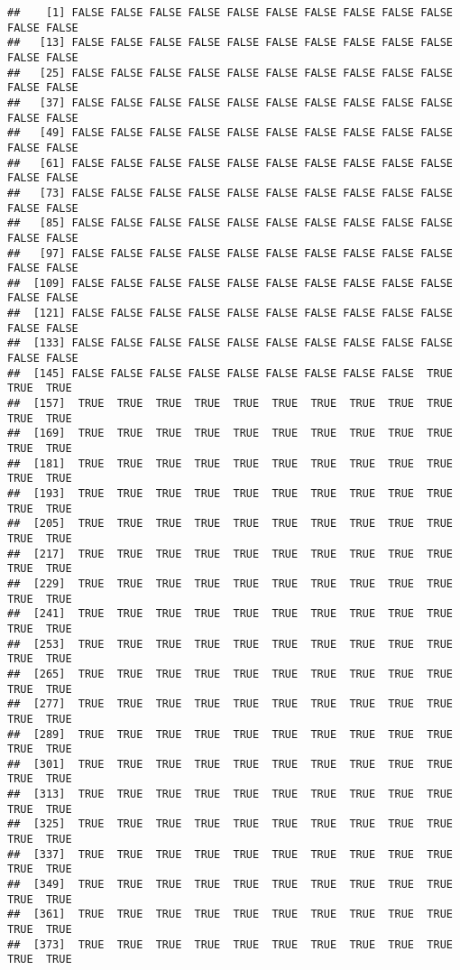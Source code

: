 \documentclass[
]{article}
\begin{document}
\begin{verbatim}
##    [1] FALSE FALSE FALSE FALSE FALSE FALSE FALSE FALSE FALSE FALSE FALSE FALSE
##   [13] FALSE FALSE FALSE FALSE FALSE FALSE FALSE FALSE FALSE FALSE FALSE FALSE
##   [25] FALSE FALSE FALSE FALSE FALSE FALSE FALSE FALSE FALSE FALSE FALSE FALSE
##   [37] FALSE FALSE FALSE FALSE FALSE FALSE FALSE FALSE FALSE FALSE FALSE FALSE
##   [49] FALSE FALSE FALSE FALSE FALSE FALSE FALSE FALSE FALSE FALSE FALSE FALSE
##   [61] FALSE FALSE FALSE FALSE FALSE FALSE FALSE FALSE FALSE FALSE FALSE FALSE
##   [73] FALSE FALSE FALSE FALSE FALSE FALSE FALSE FALSE FALSE FALSE FALSE FALSE
##   [85] FALSE FALSE FALSE FALSE FALSE FALSE FALSE FALSE FALSE FALSE FALSE FALSE
##   [97] FALSE FALSE FALSE FALSE FALSE FALSE FALSE FALSE FALSE FALSE FALSE FALSE
##  [109] FALSE FALSE FALSE FALSE FALSE FALSE FALSE FALSE FALSE FALSE FALSE FALSE
##  [121] FALSE FALSE FALSE FALSE FALSE FALSE FALSE FALSE FALSE FALSE FALSE FALSE
##  [133] FALSE FALSE FALSE FALSE FALSE FALSE FALSE FALSE FALSE FALSE FALSE FALSE
##  [145] FALSE FALSE FALSE FALSE FALSE FALSE FALSE FALSE FALSE  TRUE  TRUE  TRUE
##  [157]  TRUE  TRUE  TRUE  TRUE  TRUE  TRUE  TRUE  TRUE  TRUE  TRUE  TRUE  TRUE
##  [169]  TRUE  TRUE  TRUE  TRUE  TRUE  TRUE  TRUE  TRUE  TRUE  TRUE  TRUE  TRUE
##  [181]  TRUE  TRUE  TRUE  TRUE  TRUE  TRUE  TRUE  TRUE  TRUE  TRUE  TRUE  TRUE
##  [193]  TRUE  TRUE  TRUE  TRUE  TRUE  TRUE  TRUE  TRUE  TRUE  TRUE  TRUE  TRUE
##  [205]  TRUE  TRUE  TRUE  TRUE  TRUE  TRUE  TRUE  TRUE  TRUE  TRUE  TRUE  TRUE
##  [217]  TRUE  TRUE  TRUE  TRUE  TRUE  TRUE  TRUE  TRUE  TRUE  TRUE  TRUE  TRUE
##  [229]  TRUE  TRUE  TRUE  TRUE  TRUE  TRUE  TRUE  TRUE  TRUE  TRUE  TRUE  TRUE
##  [241]  TRUE  TRUE  TRUE  TRUE  TRUE  TRUE  TRUE  TRUE  TRUE  TRUE  TRUE  TRUE
##  [253]  TRUE  TRUE  TRUE  TRUE  TRUE  TRUE  TRUE  TRUE  TRUE  TRUE  TRUE  TRUE
##  [265]  TRUE  TRUE  TRUE  TRUE  TRUE  TRUE  TRUE  TRUE  TRUE  TRUE  TRUE  TRUE
##  [277]  TRUE  TRUE  TRUE  TRUE  TRUE  TRUE  TRUE  TRUE  TRUE  TRUE  TRUE  TRUE
##  [289]  TRUE  TRUE  TRUE  TRUE  TRUE  TRUE  TRUE  TRUE  TRUE  TRUE  TRUE  TRUE
##  [301]  TRUE  TRUE  TRUE  TRUE  TRUE  TRUE  TRUE  TRUE  TRUE  TRUE  TRUE  TRUE
##  [313]  TRUE  TRUE  TRUE  TRUE  TRUE  TRUE  TRUE  TRUE  TRUE  TRUE  TRUE  TRUE
##  [325]  TRUE  TRUE  TRUE  TRUE  TRUE  TRUE  TRUE  TRUE  TRUE  TRUE  TRUE  TRUE
##  [337]  TRUE  TRUE  TRUE  TRUE  TRUE  TRUE  TRUE  TRUE  TRUE  TRUE  TRUE  TRUE
##  [349]  TRUE  TRUE  TRUE  TRUE  TRUE  TRUE  TRUE  TRUE  TRUE  TRUE  TRUE  TRUE
##  [361]  TRUE  TRUE  TRUE  TRUE  TRUE  TRUE  TRUE  TRUE  TRUE  TRUE  TRUE  TRUE
##  [373]  TRUE  TRUE  TRUE  TRUE  TRUE  TRUE  TRUE  TRUE  TRUE  TRUE  TRUE  TRUE

\end{verbatim}
\end{document}
